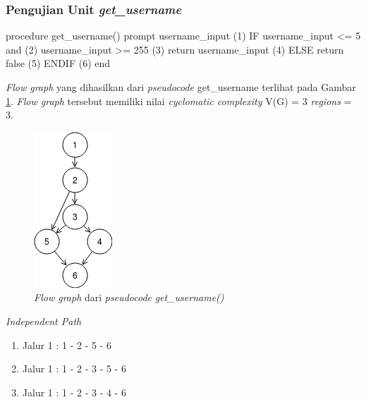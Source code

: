 \subsubsection{Pengujian Unit \emph{get\_username}}

\begin{code}
\begin{ignasicblock}[title=get\_username,minted language=text]
procedure get_username()
    prompt username_input         (1)
    IF username_input <= 5 and    (2)
       username_input >= 255      (3)
       return username_input      (4)
    ELSE
       return false               (5)
    ENDIF                         (6)
end
\end{ignasicblock}
\label{pc:get_username}
\end{code}

\par\null\par
\noindent
\emph{Flow graph} yang dihasilkan dari \emph{pseudocode}
get\_username terlihat pada Gambar \ref{cfg:get_username}. \emph{Flow graph} tersebut memiliki
nilai \emph{cyclomatic complexity} V(G) = 3 \emph{regions} = 3.

\begin{figure}[H]
  \centering
  \includegraphics[width=.16\linewidth]{img/test-case/if-and-else}
  \caption{\emph{Flow graph} dari \emph{pseudocode} \emph{get\_username()}}
  \label{cfg:get_username}
\end{figure}

\noindent
\emph{Independent Path}

\begin{enumerate}
\item Jalur 1 : 1 - 2 - 5 - 6
\item Jalur 1 : 1 - 2 - 3 - 5 - 6
\item Jalur 1 : 1 - 2 - 3 - 4 - 6
\end{enumerate}

\newpage

